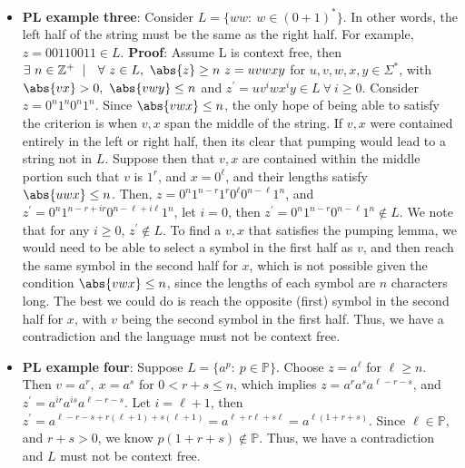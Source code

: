 \documentclass{report}
\begin{document}
\begin{itemize}
            \item \textbf{PL example three}: Consider $L = \{ww:\ w \in (0+1)^{*}\} $. In other words, the left half of the string must be the same as the right half. For example, $z = 00110011 \in L$.
                \bigbreak \noindent 
                \textbf{Proof}: Assume L is context free, then $\exists \ n \in \mathbb{Z}^+\  \mid \ \ \forall \ z \in L,\ \abs{z} \geq n \ z = uvwxy$ for $u,v,w,x,y \in \Sigma^{*}$, with $\abs{vx} > 0,\ \abs{vwy} \leq n$ and $z^{\prime} = uv^{i}wx^{i}y \in L \ \forall \ i \geq 0$.
                \bigbreak \noindent 
                Consider $z = 0^{n}1^{n}0^{n}1^{n}$. Since $\abs{vwx} \leq n$, the only hope of being able to satisfy the criterion is when $v,x$ span the middle of the string. If $v,x$ were contained entirely in the left or right half, then its clear that pumping would lead to a string not in $L$. Suppose then that $v,x$ are contained within the middle portion such that $v$ is $1^{r}$, and $x = 0^{\ell}$, and their lengths satisfy $\abs{uwx} \leq n$. Then, $z = 0^{n}1^{n-r}1^{r}0^{\ell}0^{n-\ell}1^{n}$, and $z^{\prime} = 0^{n}1^{n-r+ir}0^{n-\ell+i\ell}1^{n}$, let $i=0$, then $z^{\prime}  = 0^{n}1^{n-r}0^{n-\ell}1^{n} \not\in L$. We note that for any $i \geq 0$, $z^{\prime} \not\in L$. To find a $v,x$ that satisfies the pumping lemma, we would need to be able to select a symbol in the first half as $v$, and then reach the same symbol in the second half for $x$, which is not possible given the condition $\abs{vwx} \leq n$, since the lengths of each symbol are $n$ characters long. The best we could do is reach the opposite (first) symbol in the second half for $x$, with $v$ being the second symbol in the first half. 
                \bigbreak \noindent 
                Thus, we have a contradiction and the language must not be context free.
            \item \textbf{PL example four}: Suppose $L = \{a^{p}:\ p \in \mathbb{P}\}$. Choose $z=a^{\ell}$ for $\ell \geq n$. Then $v=a^{r},\ x = a^{s}$ for $0 < r+s \leq  n$, which implies $z = a^{r}a^{s}a^{\ell-r-s}$, and $z^{\prime} = a^{ir}a^{is}a^{\ell-r-s}$. Let $i = \ell + 1$, then $z^{\prime} = a^{\ell - r - s  + r(\ell+1) + s (\ell+1)}  = a^{\ell + r\ell + s\ell} = a^{\ell(1+r+s)}$. Since $\ell \in \mathbb{P}$, and $r+s > 0$, we know $p(1+r+s) \not\in \mathbb{P}$. Thus, we have a contradiction and $L$ must not be context free.
                



    \end{itemize}
\end{document}
